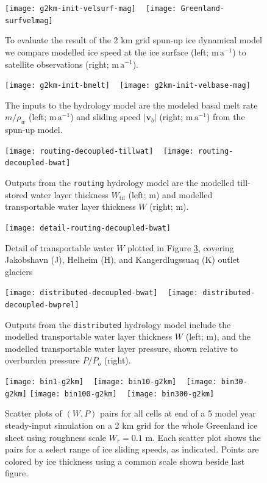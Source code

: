 \documentclass[gmd]{copernicus}   %
\newcommand{\text}{\textrm}
\newcommand\bv{\mathbf{v}}
\newcommand{\Wtil}{W_{\text{til}}}
\begin{document}
\newcommand{\grnht}{3.4in}
\begin{figure}[ht]
\mbox{\texttt{[image: g2km-init-velsurf-mag]} \,
\texttt{[image: Greenland-surfvelmag]}}
\caption{To evaluate the result of the 2 km grid spun-up ice dynamical model we compare modelled ice speed at the ice surface (left; $\mathrm{m}\,\mathrm{a}^{-1}$) to satellite observations (right; $\mathrm{m}\,\mathrm{a}^{-1}$).}
\label{fig:Greenspinupeval}
\end{figure}

\begin{figure}[ht]
\mbox{\texttt{[image: g2km-init-bmelt]} \,
\texttt{[image: g2km-init-velbase-mag]}}
\caption{The inputs to the hydrology model are the modeled basal melt rate $m/\rho_w$ (left; $\mathrm{m}\,\mathrm{a}^{-1}$) and sliding speed $|\bv_b|$ (right; $\mathrm{m}\,\mathrm{a}^{-1}$) from the spun-up model.}
\label{fig:Greenhydroinputs}
\end{figure}

\begin{figure}[ht]
\mbox{\texttt{[image: routing-decoupled-tillwat]} \,
\texttt{[image: routing-decoupled-bwat]}}
\caption{Outputs from the \texttt{routing} hydrology model are the modelled till-stored water layer thickness $\Wtil$ (left; $\mathrm{m}$) and modelled transportable water layer thickness $W$ (right; $\mathrm{m}$).}
\label{fig:Greenroutingresults}
\end{figure}

\begin{figure}[ht]
\texttt{[image: detail-routing-decoupled-bwat]}
\caption{Detail of transportable water $W$ plotted in Figure \ref{fig:Greenroutingresults}, covering Jakobshavn (J), Helheim (H), and Kangerdlugssuaq (K) outlet glaciers}
\label{fig:Greenroutingdetail}
\end{figure}

\begin{figure}[ht]
\mbox{\texttt{[image: distributed-decoupled-bwat]} \,
\texttt{[image: distributed-decoupled-bwprel]}}
\caption{Outputs from the \texttt{distributed} hydrology model include the modelled transportable water layer thickness $W$ (left; $\mathrm{m}$), and the modelled transportable water layer pressure, shown relative to overburden pressure $P/P_o$ (right).}
\label{fig:Greendistributedresults}
\end{figure}

\newcommand{\myheight}{1.8in}
\begin{figure}[ht]
\mbox{\texttt{[image: bin1-g2km]} \, \texttt{[image: bin10-g2km]} \, \texttt{[image: bin30-g2km]}}
\mbox{\texttt{[image: bin100-g2km]} \,
\texttt{[image: bin300-g2km]}}
\caption{Scatter plots of $(W,P)$ pairs for all cells at end of a 5 model year steady-input simulation on a 2 km grid for the whole Greenland ice sheet using roughness scale $W_r = 0.1$ m.  Each scatter plot shows the pairs for a select range of ice sliding speeds, as indicated.  Points are colored by ice thickness using a common scale shown beside last figure.}
\label{fig:GreenisPofW}
\end{figure}
\end{document}
